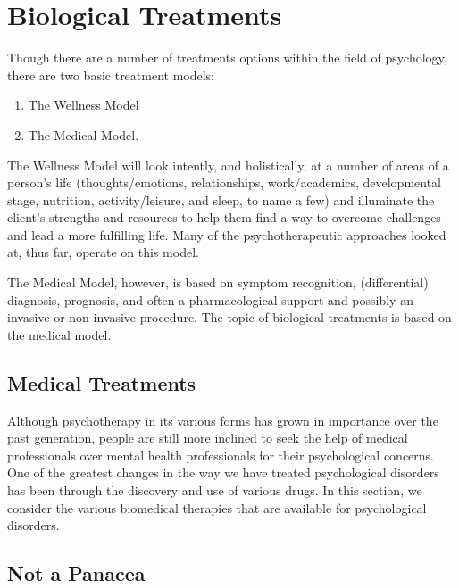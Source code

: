 \documentclass[
]{book}
\providecommand{\tightlist}{%
  \setlength{\itemsep}{0pt}\setlength{\parskip}{0pt}}
\begin{document}
\hypertarget{biological-treatments-1}{%
\section{Biological Treatments}\label{biological-treatments-1}}

Though there are a number of treatments options within the field of psychology, there are two basic treatment models:

\begin{enumerate}
\def\labelenumi{\arabic{enumi}.}
\tightlist
\item
  The Wellness Model\\
\item
  The Medical Model.
\end{enumerate}

The Wellness Model will look intently, and holistically, at a number of areas of a person's life (thoughts/emotions, relationships, work/academics, developmental stage, nutrition, activity/leisure, and sleep, to name a few) and illuminate the client's strengths and resources to help them find a way to overcome challenges and lead a more fulfilling life. Many of the psychotherapeutic approaches looked at, thus far, operate on this model.

The Medical Model, however, is based on symptom recognition, (differential) diagnosis, prognosis, and often a pharmacological support and possibly an invasive or non-invasive procedure. The topic of biological treatments is based on the medical model.

\hypertarget{medical-treatments-1}{%
\subsection*{Medical Treatments}\label{medical-treatments-1}}

Although psychotherapy in its various forms has grown in importance over the past generation, people are still more inclined to seek the help of medical professionals over mental health professionals for their psychological concerns. One of the greatest changes in the way we have treated psychological disorders has been through the discovery and use of various drugs. In this section, we consider the various biomedical therapies that are available for psychological disorders.

\hypertarget{not-a-panacea-1}{%
\subsection*{Not a Panacea}\label{not-a-panacea-1}}
\end{document}
